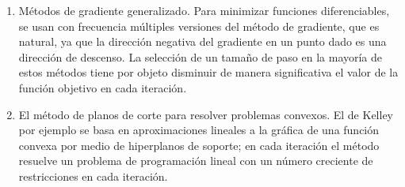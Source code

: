 \begin{enumerate}
   \item M\'etodos de gradiente generalizado. Para minimizar funciones diferenciables, se usan con frecuencia m\'ultiples versiones del 
	 m\'etodo de gradiente, que es natural, ya que la direcci\'on negativa del gradiente en un punto dado es una direcci\'on de descenso.
	 La selecci\'on de un tamaño de paso en la mayor\'ia de estos m\'etodos tiene por objeto disminuir de manera significativa el valor de 
	 la funci\'on objetivo en cada iteraci\'on.
   \item El m\'etodo de planos de corte para resolver problemas convexos. El de Kelley por ejemplo se basa en aproximaciones lineales a la
	 gr\'afica de una funci\'on convexa por medio de hiperplanos de soporte; en cada iteraci\'on el m\'etodo resuelve un problema de
	 programaci\'on lineal con un n\'umero creciente de restricciones en cada iteraci\'on.
\end{enumerate}



